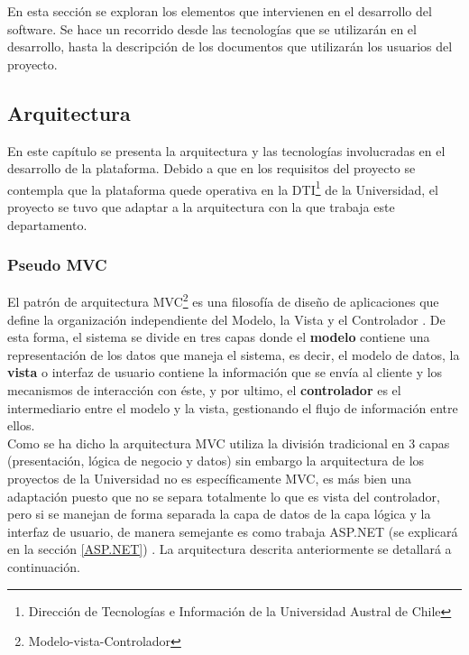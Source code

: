 En esta sección se exploran los elementos que intervienen en el desarrollo del software. Se hace un recorrido desde las tecnologías que se utilizarán en el desarrollo, hasta la descripción de los documentos que utilizarán los usuarios del proyecto.
\subsection{Arquitectura}
 
 En este capítulo se presenta la arquitectura y las tecnologías involucradas en el desarrollo de la plataforma. Debido a que en los requisitos del proyecto se contempla que la plataforma quede operativa en la  DTI\footnote{Dirección de Tecnologías e Información de la Universidad Austral de Chile} de la Universidad, el proyecto se tuvo que adaptar a la arquitectura con la que trabaja este departamento.

\subsubsection{Pseudo MVC } \label{PseudoMVC}

El patrón de arquitectura MVC\footnote{Modelo-vista-Controlador} es una filosofía de diseño de aplicaciones que define la organización independiente del Modelo, la Vista  y el Controlador \cite{eje15}. De esta forma, el sistema se divide en tres capas donde el \textbf{modelo}  contiene una representación de los datos que maneja el sistema, es decir, el modelo de datos, la \textbf{ vista}  o interfaz de usuario contiene la información que se envía al cliente y los mecanismos de interacción con éste, y por ultimo, el \textbf{controlador} es el intermediario entre el modelo y la vista, gestionando el flujo de información entre ellos.
\\

Como se ha dicho la arquitectura MVC utiliza la división tradicional en 3 capas (presentación, lógica de negocio y datos) sin embargo la arquitectura de los proyectos de la Universidad no es específicamente  MVC, es más bien una adaptación puesto que no se separa totalmente lo que es vista del controlador, pero si se manejan de forma separada la capa de datos de la capa lógica y la interfaz de usuario, de manera semejante es como trabaja ASP.NET (se explicará en la sección \ref{ASP.NET}) . La arquitectura descrita anteriormente se detallará a continuación.
\\

